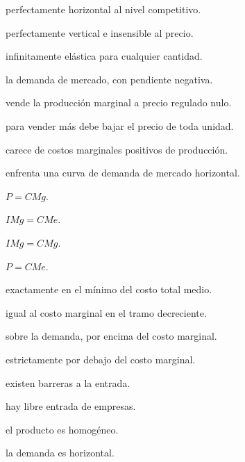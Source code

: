 \begin{opts}
    \item perfectamente horizontal al nivel competitivo.
    \item perfectamente vertical e insensible al precio.
    \item infinitamente elástica para cualquier cantidad.
    \item la demanda de mercado, con pendiente negativa.
\end{opts}

\begin{opts}
    \item vende la producción marginal a precio regulado nulo.
    \item para vender más debe bajar el precio de toda unidad.
    \item carece de costos marginales positivos de producción.
    \item enfrenta una curva de demanda de mercado horizontal.
\end{opts}

\begin{opts}
    \item $P=CMg$.
    \item $IMg=CMe$.
    \item $IMg=CMg$.
    \item $P=CMe$.
\end{opts}

\begin{opts}
    \item exactamente en el mínimo del costo total medio.
    \item igual al costo marginal en el tramo decreciente.
    \item sobre la demanda, por encima del costo marginal.
    \item estrictamente por debajo del costo marginal.
\end{opts}

\begin{opts}
    \item existen barreras a la entrada.
    \item hay libre entrada de empresas.
    \item el producto es homogéneo.
    \item la demanda es horizontal.
\end{opts}

